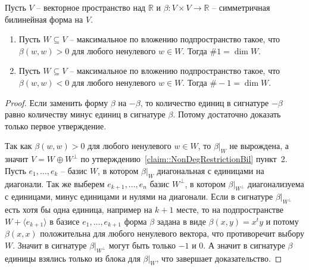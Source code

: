 \begin{claim}
Пусть $V$ -- векторное пространство над $\mathbb R$ и $\beta\colon V\times V\to \mathbb R$ -- симметричная билинейная форма на $V$.
\begin{enumerate}
\item Пусть $W\subseteq V$ -- максимальное по вложению подпространство такое, что $\beta(w, w) > 0$ для любого ненулевого $w\in W$. Тогда $\#1 = \dim W$.

\item Пусть $W\subseteq V$ -- максимальное по вложению подпространство такое, что $\beta(w, w) < 0$ для любого ненулевого $w\in W$. Тогда $\#-1 = \dim W$.
\end{enumerate}
\end{claim}
\begin{proof}
Если заменить форму $\beta$ на $-\beta$, то количество единиц в сигнатуре $-\beta$ равно количеству минус единиц в сигнатуре $\beta$. Потому достаточно доказать только первое утверждение.


Так как $\beta(w, w) > 0$ для любого ненулевого $w\in W$, то $\beta|_W$ не вырождена, а значит $V = W\oplus W^\bot$  по утверждению~\ref{claim::NonDegRestrictionBil} пункт~2. Пусть $e_1,\ldots,e_k$ -- базис $W$, в котором $\beta|_W$ диагональная с единицами на диагонали. Так же выберем $e_{k+1},\ldots,e_n$ базис $W^\bot$, в котором $\beta|_{W^\bot}$ диагонализуема с единицами, минус единицами и нулями на диагонали. Если в сигнатуре $\beta|_{W^\bot}$ есть хотя бы одна единица, например на $k+1$ месте, то на подпространстве $W+\langle e_{k+1}\rangle$ в базисе $e_1,\ldots,e_{k+1}$ форма $\beta$ задана в виде $\beta(x, y) = x^t y$ и потому $\beta(x,x)$ положительна для любого ненулевого вектора, что противоречит выбору $W$. Значит в сигнатуре $\beta|_{W^\bot}$ могут быть только $-1$ и $0$. А значит в сигнатуре $\beta$ единицы взялись только из блока для $\beta|_W$, что завершает доказательство.


\end{proof}

